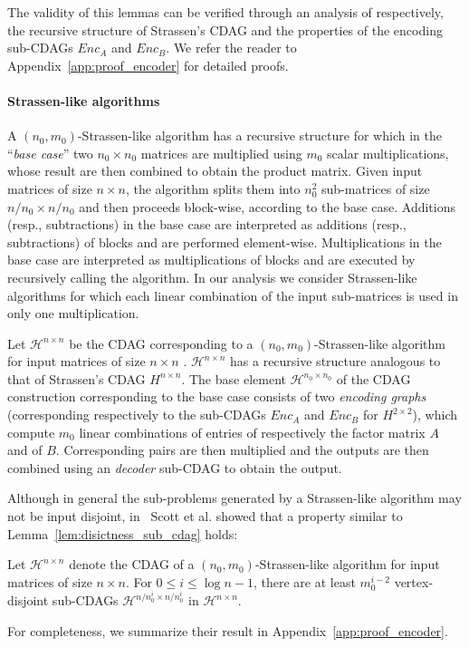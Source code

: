 \documentclass[a4paper,UKenglish]{lipics-v2016}
\newcommand{\stral}[1]{\mathcal{H}^{#1}}
\begin{document}
The validity of this lemmas can be verified through an analysis of respectively, the recursive structure of Strassen's CDAG and the properties of  the encoding sub-CDAGs $Enc_A$ and $Enc_B$. We refer the reader to Appendix~\ref{app:proof_encoder} for detailed proofs.

\paragraph*{Strassen-like algorithms}
A $(n_0,m_0)$-Strassen-like algorithm has a recursive structure for
which in the ``\emph{base case}'' two $n_0\times n_0$ matrices are
multiplied using $m_0$ scalar multiplications, whose result are then
combined to obtain the product matrix.  Given input matrices of size
$n\times n$, the algorithm splits them into $n_0^2$ sub-matrices of
size $n/n_0 \times n/n_0$ and then proceeds block-wise, according to
the base case. Additions (resp., subtractions) in the base case are
interpreted as additions (resp., subtractions) of blocks and are
performed element-wise. Multiplications in the base case are
interpreted as multiplications of blocks and are executed by
recursively calling the algorithm. In our analysis we consider
Strassen-like algorithms for which each linear combination of the
input sub-matrices is used in only one multiplication.

Let $\stral{n\times n}$ be the CDAG corresponding to a $\left(n_0,
m_0\right)$-Strassen-like algorithm for input matrices of size
$n\times n$ . $\stral{n\times n}$ has a recursive structure analogous
to that of Strassen's CDAG $H^{n\times n}$. The base element
$\stral{n_0 \times n_0}$ of the CDAG construction corresponding to the
base case consists of two \emph{encoding graphs} (corresponding
respectively to the sub-CDAGs $Enc_A$ and $Enc_B$ for $H^{2\times
  2}$), which compute $m_0$ linear combinations of entries of
respectively the factor matrix $A$ and of $B$. Corresponding pairs are
then multiplied and the outputs are then combined using an
\emph{decoder} sub-CDAG to obtain the output.

Although in general the sub-problems generated by a Strassen-like
algorithm may not be input disjoint, in~\cite{scott2015matrix} Scott
et al. showed that a property similar to
Lemma~\ref{lem:disictness_sub_cdag} holds:

\begin{lemma}\label{lem:vdigraphslike}
Let $\stral{n \times n}$ denote the CDAG of a
$(n_0,m_0)$-Strassen-like algorithm for input matrices of size $n
\times n$. For $0 \leq i \leq \log n-1$, there are at least
$m_0^{i-2}$ vertex-disjoint sub-CDAGs $\stral{n/n_0^i \times n/n_0^i}$
in $\stral{n\times n}$.
\end{lemma}
For completeness, we summarize their result in
Appendix~\ref{app:proof_encoder}.
\end{document}

